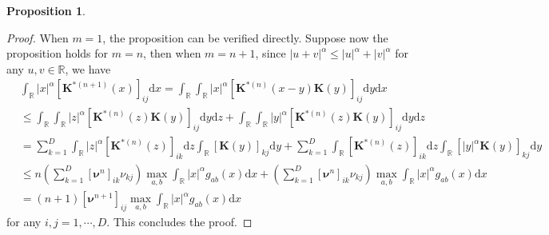 \documentclass[11pt]{article}
\numberwithin{equation}{section}
\theoremstyle{plain}
\theoremstyle{definition}
\theoremstyle{definition}
\theoremstyle{assumption}
\theoremstyle{proposition}
\newtheorem{proposition}{Proposition}[section]
\theoremstyle{proposition}
\theoremstyle{example}
\theoremstyle{lemma}
\theoremstyle{theorem}
\theoremstyle{remark}
\begin{document}
\begin{proposition}
\begin{proof}
When $m=1$, the proposition can be verified directly. Suppose now the proposition holds for $m = n$, then when $m=n+1$, since $|u+v|^{\alpha}\leqslant |u|^{\alpha} + |v|^{\alpha}$ for any $u,v\in\mathbb{R}$, we have
\begin{align*}
&\int_{\mathbb{R}}|x|^{\alpha}[\boldsymbol{K}^{*(n+1)}(x)]_{ij}\mathrm{d}x
= \int_{\mathbb{R}}\int_{\mathbb{R}}|x|^{\alpha}[\boldsymbol{K}^{*(n)}(x - y)\boldsymbol{K}(y)]_{ij}\mathrm{d}y\mathrm{d}x \\
&\leqslant \int_{\mathbb{R}}\int_{\mathbb{R}}|z|^{\alpha}[\boldsymbol{K}^{*(n)}(z)\boldsymbol{K}(y)]_{ij}\mathrm{d}y\mathrm{d}z
+ \int_{\mathbb{R}}\int_{\mathbb{R}}|y|^{\alpha}[\boldsymbol{K}^{*(n)}(z)\boldsymbol{K}(y)]_{ij}\mathrm{d}y\mathrm{d}z \\
&=\sum_{k=1}^D \int_{\mathbb{R}}|z|^{\alpha}[\boldsymbol{K}^{*(n)}(z)]_{ik}\mathrm{d}z\int_{\mathbb{R}}[\boldsymbol{K}(y)]_{kj}\mathrm{d}y
+\sum_{k=1}^D \int_{\mathbb{R}}[\boldsymbol{K}^{*(n)}(z)]_{ik}\mathrm{d}z\int_{\mathbb{R}}[|y|^{\alpha}\boldsymbol{K}(y)]_{kj}\mathrm{d}y \\
&\leqslant n\left(\sum_{k=1}^D [\boldsymbol{\nu}^n]_{ik}\nu_{kj}\right)\max_{a,b}\int_{\mathbb{R}}|x|^{\alpha}g_{ab}(x)\mathrm{d}x
+\left(\sum_{k=1}^D[\boldsymbol{\nu}^n]_{ik}\nu_{kj}\right)\max_{a,b}\int_{\mathbb{R}}|x|^{\alpha}g_{ab}(x)\mathrm{d}x\\
&= (n+1) [\boldsymbol{\nu}^{n+1}]_{ij}\max_{a,b}\int_{\mathbb{R}}|x|^{\alpha}g_{ab}(x)\mathrm{d}x
\end{align*}
for any $i,j=1,\cdots,D$. This concludes the proof.
\end{proof}
\end{proposition}
\end{document}
